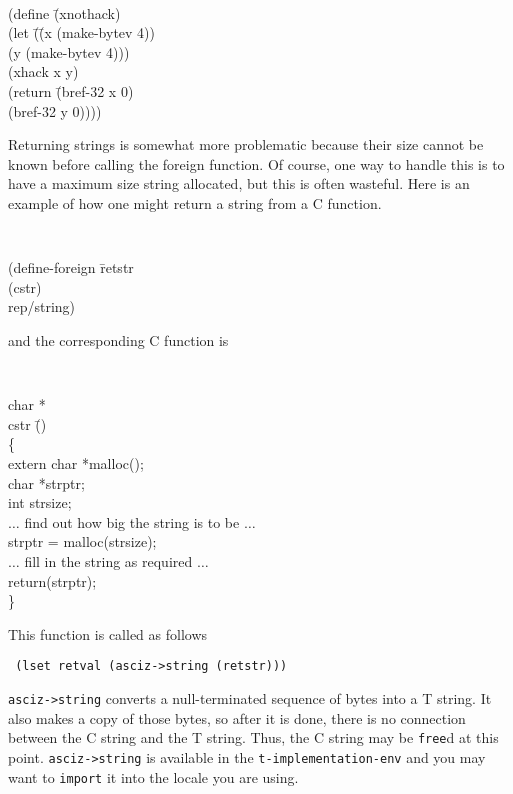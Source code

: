\horizline
{\tt
\begin{tabbing}
(define \= (xnothack)\\
	\> (let \= (\= (x (make-bytev 4))\\
			\>\>\> (y (make-bytev 4)))\\
		\>\> (xhack x y)\\
		\>\> (return \= (bref-32 x 0)\\
			\>\>\> (bref-32 y 0))))
\end{tabbing}
}
\horizline

Returning strings is somewhat more problematic because their size
cannot be known before calling the foreign function.
Of course, one way to handle this is to have a maximum size string
allocated, but this is often wasteful.
Here is an example of how one might return a string from a C function.

\horizline
{\tt
\begin{tabbing}
(define-foreign \= retstr\+ \\
	(cstr)\\
	rep/string)
\end{tabbing}
}
\horizline

and the corresponding C function is

\horizline
{\tt
\begin{tabbing}
char *\\
cstr \=()\\
\{\+ \\
	extern char *malloc();\\
	char *strptr;\\
	int strsize;\\[2ex]

	$\dots$ find out how big the string is to be $\dots$\\
	strptr = malloc(strsize);\\
	$\dots$ fill in the string as required $\dots$\\
	return(strptr);\- \\
\}
\end{tabbing}
}
\horizline

This function is called as follows
\begin{center}
\tt
(lset retval (asciz->string (retstr)))
\end{center}
\verb!asciz->string! converts a null-terminated sequence of bytes into
a T string.
It also makes a copy of those bytes, so after it is done, there is no
connection between the C string and the T string.
Thus, the C string may be {\tt free}d at this point.
\verb!asciz->string! is available in the \verb!t-implementation-env!
and you may want to \verb!import! it into the locale you are using.

